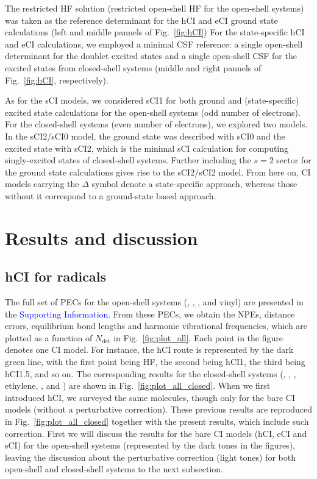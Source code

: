 \documentclass[aip,jcp,reprint,noshowkeys,superscriptaddress]{revtex4-1}
\newcommand{\SupInf}{\textcolor{blue}{Supporting Information}}
\newcommand{\Ndet}{N_\text{det}}
\begin{document}
The restricted HF solution (restricted open-shell HF for the open-shell systems) was taken as the reference determinant for the hCI and eCI ground state calculations 
(left and middle pannels of Fig.~\ref{fig:hCI})
For the state-specific hCI and eCI calculations, we employed a minimal CSF reference: \cite{Kossoski_2023}
a single open-shell determinant for the doublet excited states and a single open-shell CSF for the excited states from closed-shell systems
(middle and right pannels of Fig.~\ref{fig:hCI}, respectively).

As for the sCI models, 
we considered sCI1 for both ground and (state-specific) excited state calculations for the open-shell systems (odd number of electrons).
For the closed-shell systems (even number of electrons), we explored two models.
In the sCI2/sCI0 model, the ground state was described with sCI0 and the excited state with sCI2, which is the minimal sCI calculation for computing singly-excited states of closed-shell systems.
Further including the $s=2$ sector for the ground state calculations gives rise to the sCI2/sCI2 model.
From here on, CI models carrying the $\Delta$ symbol denote a state-specific approach, whereas those without it correspond to a ground-state based approach.


\section{Results and discussion}
\label{sec:res}

\subsection{hCI for radicals}
\label{sec:res_A}

The full set of PECs for the open-shell systems (, , , and vinyl) are presented in the {\SupInf}.
From these PECs, we obtain the NPEs, distance errors, equilibrium bond lengths and harmonic vibrational frequencies, which are plotted as a function of $\Ndet$ in Fig.~\ref{fig:plot_all}.
Each point in the figure denotes one CI model.
For instance, the hCI route is represented by the dark green line, with the first point being HF, the second being hCI1, the third being hCI1.5, and so on.
The corresponding results for the closed-shell systems (, , , ethylene, , and ) are shown in Fig.~\ref{fig:plot_all_closed}.
When we first introduced hCI, \cite{Kossoski_2022} we surveyed the same molecules, though only for the bare CI models (without a perturbative correction).
These previous results are reproduced in Fig.~\ref{fig:plot_all_closed} together with the present results, which include such correction.
First we will discuss the results for the bare CI models (hCI, eCI and sCI) for the open-shell systems (represented by the dark tones in the figures),
leaving the discussion about the perturbative correction (light tones) for both open-shell and closed-shell systems to the next subsection.
\end{document}

